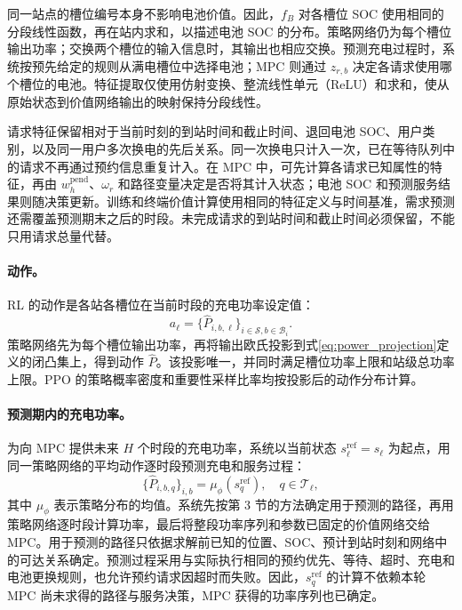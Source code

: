\documentclass[12pt,a4paper,UTF8]{ctexart}
\begin{document}
同一站点的槽位编号本身不影响电池价值。因此，$f_B$ 对各槽位 SOC 使用相同的分段线性函数，再在站内求和，以描述电池 SOC 的分布。策略网络仍为每个槽位输出功率；交换两个槽位的输入信息时，其输出也相应交换。预测充电过程时，系统按预先给定的规则从满电槽位中选择电池；MPC 则通过 $z_{r,b}$ 决定各请求使用哪个槽位的电池。特征提取仅使用仿射变换、整流线性单元（ReLU）和求和，使从原始状态到价值网络输出的映射保持分段线性。

请求特征保留相对于当前时刻的到站时间和截止时间、退回电池 SOC、用户类别，以及同一用户多次换电的先后关系。同一次换电只计入一次，已在等待队列中的请求不再通过预约信息重复计入。在 MPC 中，可先计算各请求已知属性的特征，再由 $w_h^{\mathrm{pend}}$、$\omega_r$ 和路径变量决定是否将其计入状态；电池 SOC 和预测服务结果则随决策更新。训练和终端价值计算使用相同的特征定义与时间基准，需求预测还需覆盖预测期末之后的时段。未完成请求的到站时间和截止时间必须保留，不能只用请求总量代替。

\paragraph{动作。}
RL 的动作是各站各槽位在当前时段的充电功率设定值：
\begin{equation}
a_\ell=
\{\widehat P_{i,b,\ell}\}_{i\in\mathcal S,b\in\mathcal B_i}.
\label{eq:rl_action}
\end{equation}
策略网络先为每个槽位输出功率，再将输出欧氏投影到式\eqref{eq:power_projection}定义的闭凸集上，得到动作 $\widehat P$。该投影唯一，并同时满足槽位功率上限和站级总功率上限。PPO 的策略概率密度和重要性采样比率均按投影后的动作分布计算。

\paragraph{预测期内的充电功率。}
为向 MPC 提供未来 $H$ 个时段的充电功率，系统以当前状态
$s_{\ell}^{\mathrm{ref}}=s_\ell$ 为起点，用同一策略网络的平均动作逐时段预测充电和服务过程：
\begin{equation}
\{\widehat P_{i,b,q}\}_{i,b}
=
\mu_\phi(s_{q}^{\mathrm{ref}}),
\quad q\in\mathcal T_\ell,
\label{eq:rl_power_rollout}
\end{equation}
其中 $\mu_\phi$ 表示策略分布的均值。系统先按第 3 节的方法确定用于预测的路径，再用策略网络逐时段计算功率，最后将整段功率序列和参数已固定的价值网络交给 MPC。用于预测的路径只依据求解前已知的位置、SOC、预计到站时刻和网络中的可达关系确定。预测过程采用与实际执行相同的预约优先、等待、超时、充电和电池更换规则，也允许预约请求因超时而失败。因此，$s_q^{\mathrm{ref}}$ 的计算不依赖本轮 MPC 尚未求得的路径与服务决策，MPC 获得的功率序列也已确定。
\end{document}
